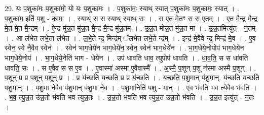 \documentclass[17pt]{extarticle}
\begin{document}
29. यः प॒शुका॑मः प॒शुका॑मो॒ यो यः प॒शुका॑मः । . प॒शुका॑मः॒ स्याथ् स्यात् प॒शुका॑मः प॒शुका॑मः॒ स्यात् । . प॒शुका॑म॒ इति॑ प॒शु - का॒मः॒ । . स्याथ् स स स्याथ् स्याथ् सः । . स ए॒त मे॒तꣳ स स ए॒तम् । . ए॒त मै॒न्द्र मै॒न्द्र मे॒त मे॒त मै॒न्द्रम् । . ऐ॒न्द्र मु॑न्न॒त मु॑न्न॒त मै॒न्द्र मै॒न्द्र मु॑न्न॒तम् । . उ॒न्न॒त मोन्न॒त मु॑न्न॒त मा । . उ॒न्न॒तमित्यु॑त् - न॒तम् । . आ ल॑भेत लभे॒ता ल॑भेत । . ल॒भे॒ते न्द्र॒ मिन्द्र॑म् ॅलभेत लभे॒ते न्द्र᳚म् । . इन्द्र॑ मे॒वैवे न्द्र॒ मिन्द्र॑ मे॒व । . ए॒व स्वेन॒ स्वे नै॒वैव स्वेन॑ । . स्वेन॑ भाग॒धेये॑न भाग॒धेये॑न॒ स्वेन॒ स्वेन॑ भाग॒धेये॑न । . भा॒ग॒धेये॒नोपोप॑ भाग॒धेये॑न भाग॒धेये॒नोप॑ । . भा॒ग॒धेये॒नेति॑ भाग - धेये॑न । . उप॑ धावति धाव॒ त्युपोप॑ धावति । . धा॒व॒ति॒ स स धा॑वति धावति॒ सः । . स ए॒वैव स स ए॒व । . ए॒वास्मा॑ अस्मा ए॒वैवास्मै᳚ । . अ॒स्मै॒ प॒शून् प॒शू न॑स्मा अस्मै प॒शून् । . प॒शून् प्र प्र प॒शून् प॒शून् प्र । . प्र य॑च्छति यच्छति॒ प्र प्र य॑च्छति । . य॒च्छ॒ति॒ प॒शु॒मान् प॑शु॒मान्. य॑च्छति यच्छति पशु॒मान् । . प॒शु॒मा ने॒वैव प॑शु॒मान् प॑शु॒मा ने॒व । . प॒शु॒मानिति॑ पशु - मान् । . ए॒व भ॑वति भव त्ये॒वैव भ॑वति । . भ॒व॒ त्यु॒न्न॒त उ॑न्न॒तो भ॑वति भव त्युन्न॒तः । . उ॒न्न॒तो भ॑वति भव त्युन्न॒त उ॑न्न॒तो भ॑वति । . उ॒न्न॒त इत्यु॑त् - न॒तः । \newline
\end{document}
